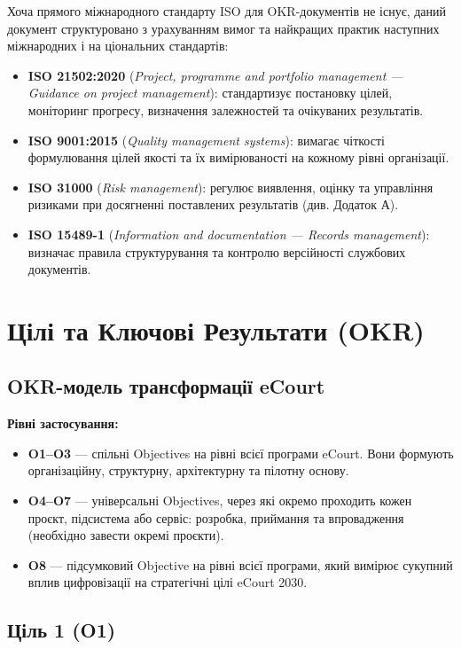 \documentclass{article}
\begin{document}
Хоча прямого міжнародного стандарту ISO для OKR-документів не існує, даний документ структуровано з урахуванням вимог та найкращих практик наступних міжнародних і на
ціональних стандартів:

\begin{itemize}
    \item \textbf{ISO 21502:2020} (\emph{Project, programme and portfolio management --- Guidance on project management}): стандартизує постановку цілей, моніторинг прогресу, визначення залежностей та очікуваних результатів.
    \item \textbf{ISO 9001:2015} (\emph{Quality management systems}): вимагає чіткості формулювання цілей якості та їх вимірюваності на кожному рівні організації.
    \item \textbf{ISO 31000} (\emph{Risk management}): регулює виявлення, оцінку та управління ризиками при досягненні поставлених результатів (див. Додаток А).
    \item \textbf{ISO 15489-1} (\emph{Information and documentation --- Records management}): визначає правила структурування та контролю версійності службових документів.
\end{itemize}

\section{Цілі та Ключові Результати (OKR)}

\subsection{OKR-модель трансформації eCourt}

\textbf{Рівні застосування:}
\begin{itemize}
    \item \textbf{O1–O3} — спільні Objectives на рівні всієї програми eCourt. Вони формують організаційну, структурну, архітектурну та пілотну основу.
    \item \textbf{O4–O7} — універсальні Objectives, через які окремо проходить кожен проєкт, підсистема або сервіс: розробка, приймання та впровадження (необхідно завести окремі проєкти).
    \item \textbf{O8} — підсумковий Objective на рівні всієї програми, який вимірює сукупний вплив цифровізації на стратегічні цілі eCourt 2030.
\end{itemize}

\newpage

\subsection{Ціль 1 (O1)}
\end{document}
